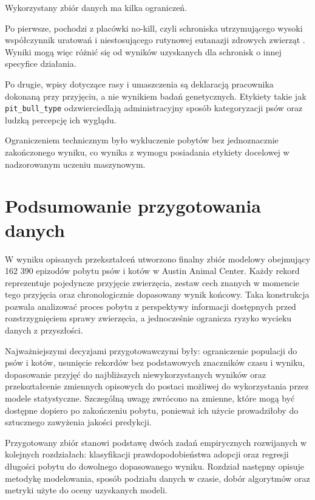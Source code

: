 Wykorzystany zbiór danych ma kilka ograniczeń.

Po pierwsze, pochodzi z placówki no-kill, czyli schroniska utrzymującego wysoki współczynnik uratowań i niestosującego rutynowej eutanazji zdrowych zwierząt \cite{Austin2010}. Wyniki mogą więc różnić się od wyników uzyskanych dla schronisk o innej specyfice działania.

Po drugie, wpisy dotyczące rasy i umaszczenia są deklaracją pracownika dokonaną przy przyjęciu, a nie wynikiem badań genetycznych. Etykiety takie jak \texttt{pit\_bull\_type} odzwierciedlają administracyjny sposób kategoryzacji psów oraz ludzką percepcję ich wyglądu.

Ograniczeniem technicznym było wykluczenie pobytów bez jednoznacznie zakończonego wyniku, co wynika z wymogu posiadania etykiety docelowej w nadzorowanym uczeniu maszynowym.

\section{Podsumowanie przygotowania danych}
\label{sec:podsumowanie-przygotowania-danych}

W wyniku opisanych przekształceń utworzono finalny zbiór modelowy obejmujący 162 390 epizodów pobytu psów i kotów w Austin Animal Center. Każdy rekord reprezentuje pojedyncze przyjęcie zwierzęcia, zestaw cech znanych w momencie tego przyjęcia oraz chronologicznie dopasowany wynik końcowy. Taka konstrukcja pozwala analizować proces pobytu z perspektywy informacji dostępnych przed rozstrzygnięciem sprawy zwierzęcia, a jednocześnie ogranicza ryzyko wycieku danych z przyszłości.

Najważniejszymi decyzjami przygotowawczymi były: ograniczenie populacji do psów i kotów, usunięcie rekordów bez podstawowych znaczników czasu i wyniku, dopasowanie przyjęć do najbliższych niewykorzystanych wyników oraz przekształcenie zmiennych opisowych do postaci możliwej do wykorzystania przez modele statystyczne. Szczególną uwagę zwrócono na zmienne, które mogą być dostępne dopiero po zakończeniu pobytu, ponieważ ich użycie prowadziłoby do sztucznego zawyżenia jakości predykcji.

Przygotowany zbiór stanowi podstawę dwóch zadań empirycznych rozwijanych w kolejnych rozdziałach: klasyfikacji prawdopodobieństwa adopcji oraz regresji długości pobytu do dowolnego dopasowanego wyniku. Rozdział następny opisuje metodykę modelowania, sposób podziału danych w czasie, dobór algorytmów oraz metryki użyte do oceny uzyskanych modeli.